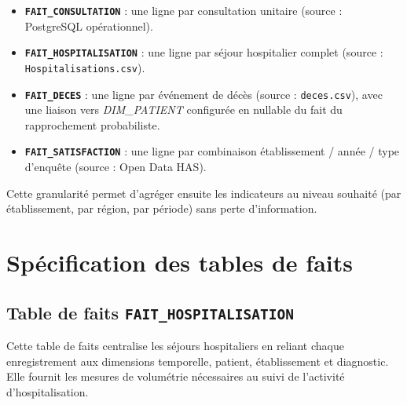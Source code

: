\documentclass[12pt, a4paper]{report}
\newcommand{\code}[1]{\texttt{#1}}
\newcommand{\dimpat}{{\small\textit{DIM\_PATIENT}}}
\begin{document}
\begin{itemize}[label=\textcolor{chuBlue}{\textbullet}]
\begin{itemize}[label=\textcolor{chuBlue}{\textbullet}]
  \item \textbf{\code{FAIT\_CONSULTATION}} : une ligne par consultation unitaire (source : PostgreSQL opérationnel).
  \item \textbf{\code{FAIT\_HOSPITALISATION}} : une ligne par séjour hospitalier complet (source : \code{Hospitalisations.csv}).
  \item \textbf{\code{FAIT\_DECES}} : une ligne par événement de décès (source : \code{deces.csv}), avec une liaison vers \dimpat{} configurée en nullable du fait du rapprochement probabiliste.
  \item \textbf{\code{FAIT\_SATISFACTION}} : une ligne par combinaison établissement / année / type d’enquête (source : Open Data HAS). 
\end{itemize}

Cette granularité permet d’agréger ensuite les indicateurs au niveau souhaité (par établissement, par région, par période) sans perte d’information.

\clearpage

\section{Spécification des tables de faits}

\subsection{Table de faits \texttt{FAIT\_HOSPITALISATION}}

Cette table de faits centralise les séjours hospitaliers en reliant chaque enregistrement
aux dimensions temporelle, patient, établissement et diagnostic. Elle fournit les mesures
de volumétrie nécessaires au suivi de l’activité d’hospitalisation.


\end{itemize}
\end{document}
